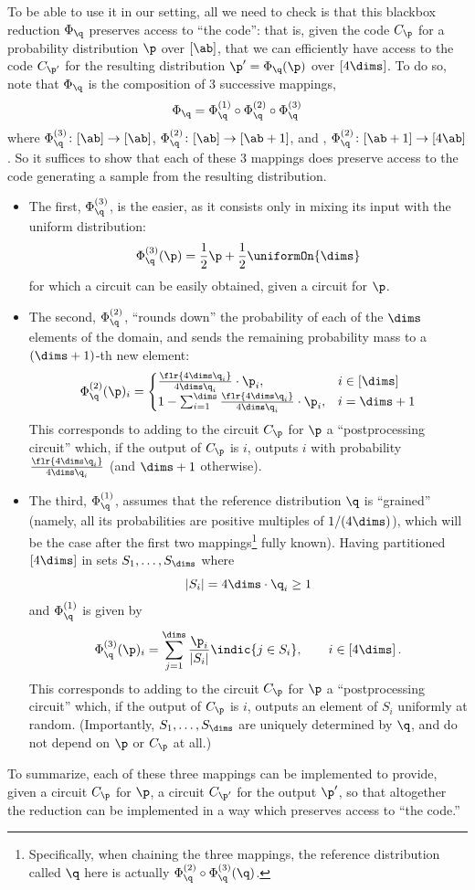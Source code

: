 \documentclass[11pt]{article}
\begin{document}
To be able to use it in our setting, all we need to check is that this blackbox reduction $\Phi_\q$ preserves access to ``the code'': that is, given the code $C_\p$ for a probability distribution $\p$ over $[\ab]$, that we can efficiently have access to the code $C_{\p'}$ for the resulting distribution $\p'=\Phi_\q(\p)$ over $[4\dims]$. 
To do so, note that $\Phi_\q$ is the composition of 3 successive mappings,
\[
  \Phi_\q = \Phi_\q^{(1)}\circ\Phi_\q^{(2)}\circ\Phi_\q^{(3)}
\]
where $\Phi_\q^{(3)}\colon[\ab]\to[\ab]$, $\Phi_\q^{(2)}\colon[\ab]\to[\ab+1]$, and , $\Phi_\q^{(2)}\colon[\ab+1]\to[4\ab]$. So it suffices to show that each of these 3 mappings does preserve access to the code generating a sample from the resulting distribution.
\begin{itemize}
  \item The first, $\Phi_\q^{(3)}$, is the easier, as it consists only in mixing its input with the uniform distribution:
  \[
    \Phi_\q^{(3)}(\p) = \frac{1}{2}\p + \frac{1}{2}\uniformOn{\dims}
  \]
  for which a circuit can be easily obtained, given a circuit for $\p$.\vspace{-0.5em}
  \item The second, $\Phi_\q^{(2)}$, ``rounds down'' the probability of each of the $\dims$ elements of the domain, and sends the remaining probability mass to a $(\dims+1)$-th new element:
  \[
      \Phi_\q^{(2)}(\p)_i = 
      \begin{cases}
        \frac{\flr{4\dims\q_i}}{4\dims\q_i}\cdot \p_i, & i\in[\dims]\\
        1- \sum_{i=1}^\dims \frac{\flr{4\dims\q_i}}{4\dims\q_i}\cdot \p_i, & i=\dims+1
      \end{cases}
  \]
  This corresponds to adding to the circuit $C_\p$ for $\p$ a ``postprocessing circuit'' which, if the output of $C_\p$ is $i$, outputs $i$ with probability $\frac{\flr{4\dims\q_i}}{4\dims\q_i}$ (and $\dims+1$ otherwise).\vspace{-0.5em}
  \item The third, $\Phi_\q^{(1)}$, assumes that the reference distribution $\q$ is ``grained'' (namely, all its probabilities are positive multiples of $1/(4\dims)$), which will be the case after the first two mappings\footnote{Specifically, when chaining the three mappings, the reference distribution called $\q$ here is actually $\Phi_\q^{(2)}\circ \Phi_\q^{(3)}(\q)$.} fully known). Having partitioned $[4\dims]$ in sets $S_1,\dots, S_\dims$ where 
  \[
    |S_i| = 4\dims\cdot \q_i \geq 1
  \]
  and $\Phi_\q^{(1)}$ is given by
  \[
      \Phi_\q^{(3)}(\p)_i = \sum_{j=1}^\dims \frac{\p_i}{|S_i|} \indic{j\in S_i} ,\qquad  i\in[4\dims]\,.
  \]
  This corresponds to adding to the circuit $C_\p$ for $\p$ a ``postprocessing circuit'' which, if the output of $C_\p$ is $i$, outputs an element of $S_i$ uniformly at random. (Importantly, $S_1,\dots, S_\dims$ are uniquely determined by $\q$, and do not depend on $\p$ or $C_\p$ at all.)
\end{itemize}
To summarize, each of these three mappings can be implemented to provide, given a circuit $C_\p$ for $\p$, a circuit $C_{\p'}$ for the output $\p'$, so that altogether the reduction can be implemented in a way which preserves access to ``the code.''
 
\end{document}
